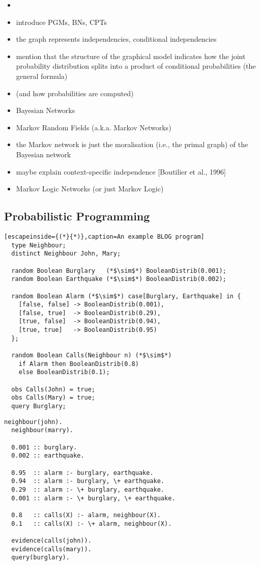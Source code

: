 \begin{itemize}
\item \citep{DBLP:series/synthesis/2019Dechter}
\item introduce PGMs, BNs, CPTs
\item the graph represents independencies, conditional independencies
\item mention that the structure of the graphical model indicates how the joint probability distribution splits into a product of conditional probabilities (the general formula)
\item (and how probabilities are computed)
\item Bayesian Networks \citep{DBLP:books/daglib/0066829}
\item Markov Random Fields (a.k.a. Markov Networks)
\item the Markov network is just the moralisation (i.e., the primal graph) of the Bayesian network
\item maybe explain context-specific independence [Boutilier et al., 1996]
\item Markov Logic Networks (or just Markov Logic) \citep{DBLP:journals/ml/RichardsonD06}
\end{itemize}

\subsection{Probabilistic Programming} \label{sec:probprogramming}

\begin{lstlisting}[escapeinside={(*}{*)},caption=An example BLOG program]
  type Neighbour;
  distinct Neighbour John, Mary;

  random Boolean Burglary   (*$\sim$*) BooleanDistrib(0.001);
  random Boolean Earthquake (*$\sim$*) BooleanDistrib(0.002);

  random Boolean Alarm (*$\sim$*) case[Burglary, Earthquake] in {
    [false, false] -> BooleanDistrib(0.001),
    [false, true]  -> BooleanDistrib(0.29),
    [true, false]  -> BooleanDistrib(0.94),
    [true, true]   -> BooleanDistrib(0.95)
  };

  random Boolean Calls(Neighbour n) (*$\sim$*)
    if Alarm then BooleanDistrib(0.8)
    else BooleanDistrib(0.1);

  obs Calls(John) = true;
  obs Calls(Mary) = true;
  query Burglary;
\end{lstlisting}

\begin{lstlisting}[caption=An example ProbLog program]
  neighbour(john).
  neighbour(marry).

  0.001 :: burglary.
  0.002 :: earthquake.

  0.95  :: alarm :- burglary, earthquake.
  0.94  :: alarm :- burglary, \+ earthquake.
  0.29  :: alarm :- \+ burglary, earthquake.
  0.001 :: alarm :- \+ burglary, \+ earthquake.

  0.8   :: calls(X) :- alarm, neighbour(X).
  0.1   :: calls(X) :- \+ alarm, neighbour(X).

  evidence(calls(john)).
  evidence(calls(mary)).
  query(burglary).
\end{lstlisting}

